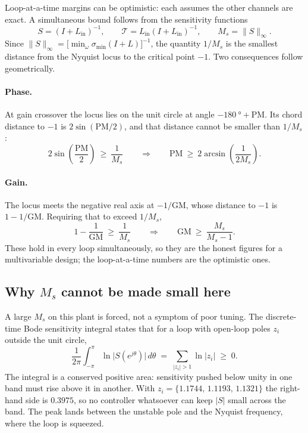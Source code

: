 Loop-at-a-time margins can be optimistic: each assumes the other channels are
exact. A simultaneous bound follows from the sensitivity functions
\begin{equation}
  S=(I+L_{\mathrm{in}})^{-1},\qquad
  \mathcal{T}=L_{\mathrm{in}}(I+L_{\mathrm{in}})^{-1},\qquad
  M_s=\lVert S\rVert_\infty .
\end{equation}
Since $\lVert S\rVert_\infty=\bigl[\min_\omega\sigma_{\min}(I+L)\bigr]^{-1}$, the
quantity $1/M_s$ is the smallest distance from the Nyquist locus to the critical
point $-1$. Two consequences follow geometrically.

\paragraph{Phase.} At gain crossover the locus lies on the unit circle at angle
$-\SI{180}{\degree}+\mathrm{PM}$. Its chord distance to $-1$ is
$2\sin(\mathrm{PM}/2)$, and that distance cannot be smaller than $1/M_s$:
\begin{equation}
  2\sin\!\left(\frac{\mathrm{PM}}{2}\right)\ \ge\ \frac{1}{M_s}
  \qquad\Longrightarrow\qquad
  \mathrm{PM}\ \ge\ 2\arcsin\!\left(\frac{1}{2M_s}\right).
\end{equation}

\paragraph{Gain.} The locus meets the negative real axis at $-1/\mathrm{GM}$, whose
distance to $-1$ is $1-1/\mathrm{GM}$. Requiring that to exceed $1/M_s$,
\begin{equation}
  1-\frac{1}{\mathrm{GM}}\ \ge\ \frac{1}{M_s}
  \qquad\Longrightarrow\qquad
  \mathrm{GM}\ \ge\ \frac{M_s}{M_s-1}.
\end{equation}
These hold in every loop simultaneously, so they are the honest figures for a
multivariable design; the loop-at-a-time numbers are the optimistic ones.

\subsection{Why $M_s$ cannot be made small here}

A large $M_s$ on this plant is forced, not a symptom of poor tuning. The
discrete-time Bode sensitivity integral states that for a loop with open-loop poles
$z_i$ outside the unit circle,
\begin{equation}
  \frac{1}{2\pi}\int_{-\pi}^{\pi}\ln\bigl|S(e^{j\theta})\bigr|\,d\theta
  \;=\;\sum_{|z_i|>1}\ln|z_i| \;\ge\;0 .
\end{equation}
The integral is a conserved positive area: sensitivity pushed below unity in one
band must rise above it in another. With
$z_i=\{1.1744,\,1.1193,\,1.1321\}$ the right-hand side is $0.3975$, so no
controller whatsoever can keep $|S|$ small across the band. The peak lands between
the unstable pole and the Nyquist frequency, where the loop is squeezed.

